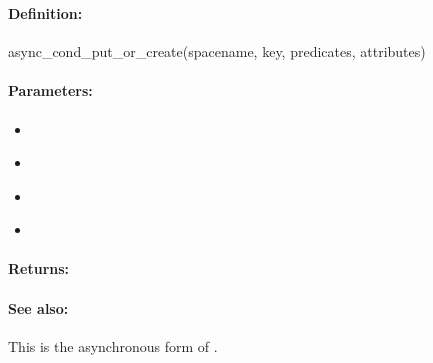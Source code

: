 \pagebreak
\subsubsection{}
\label{api:ruby:async_cond_put_or_create}


\paragraph{Definition:}
\begin{rubycode}
async_cond_put_or_create(spacename, key, predicates, attributes)
\end{rubycode}

\paragraph{Parameters:}
\begin{itemize}[noitemsep]
\item {}\\

\item {}\\

\item {}\\

\item {}\\

\end{itemize}

\paragraph{Returns:}


\paragraph{See also:}  This is the asynchronous form of .

\pagebreak
\subsubsection{}
\label{api:ruby:group_put}


